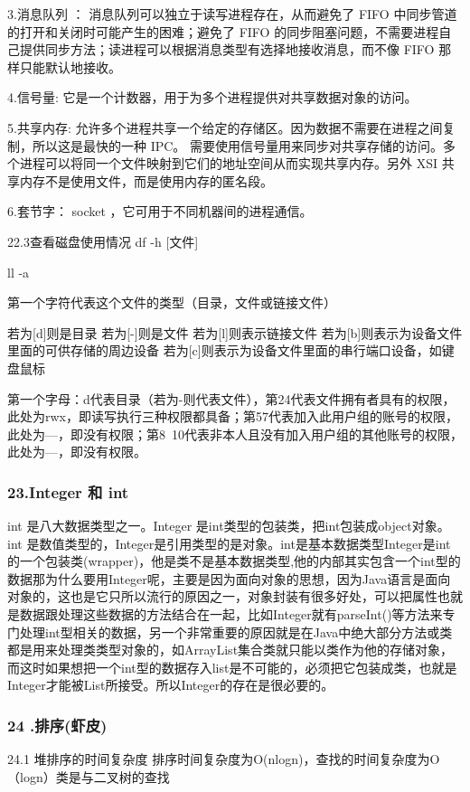 \documentclass[UTF8]{ctexart}
\begin{document}
3.消息队列 ： 消息队列可以独立于读写进程存在，从而避免了 FIFO 中同步管道的打开和关闭时可能产生的困难；避免了 FIFO 的同步阻塞问题，不需要进程自己提供同步方法；读进程可以根据消息类型有选择地接收消息，而不像 FIFO 那样只能默认地接收。

4.信号量: 它是一个计数器，用于为多个进程提供对共享数据对象的访问。

5.共享内存: 允许多个进程共享一个给定的存储区。因为数据不需要在进程之间复制，所以这是最快的一种 IPC。
需要使用信号量用来同步对共享存储的访问。多个进程可以将同一个文件映射到它们的地址空间从而实现共享内存。另外 XSI 共享内存不是使用文件，而是使用内存的匿名段。

6.套节字： socket ，它可用于不同机器间的进程通信。

22.3查看磁盘使用情况
df -h [文件]

ll -a

第一个字符代表这个文件的类型（目录，文件或链接文件）

若为[d]则是目录
若为[-]则是文件
若为[l]则表示链接文件
若为[b]则表示为设备文件里面的可供存储的周边设备
若为[c]则表示为设备文件里面的串行端口设备，如键盘鼠标

第一个字母：d代表目录（若为-则代表文件），第24代表文件拥有者具有的权限，此处为rwx，即读写执行三种权限都具备；第57代表加入此用户组的账号的权限，此处为—，即没有权限；第8~10代表非本人且没有加入用户组的其他账号的权限，此处为—，即没有权限。

\subsubsection{23.Integer 和 int}
int 是八大数据类型之一。Integer 是int类型的包装类，把int包装成object对象。int 是数值类型的，Integer是引用类型的是对象。int是基本数据类型Integer是int的一个包装类(wrapper)，他是类不是基本数据类型,他的内部其实包含一个int型的数据那为什么要用Integer呢，主要是因为面向对象的思想，因为Java语言是面向对象的，这也是它只所以流行的原因之一，对象封装有很多好处，可以把属性也就是数据跟处理这些数据的方法结合在一起，比如Integer就有parseInt()等方法来专门处理int型相关的数据，另一个非常重要的原因就是在Java中绝大部分方法或类都是用来处理类类型对象的，如ArrayList集合类就只能以类作为他的存储对象，而这时如果想把一个int型的数据存入list是不可能的，必须把它包装成类，也就是Integer才能被List所接受。所以Integer的存在是很必要的。

\subsubsection{24 .排序(虾皮)}
24.1 堆排序的时间复杂度
排序时间复杂度为O(nlogn)，查找的时间复杂度为O（logn）类是与二叉树的查找
\end{document}
